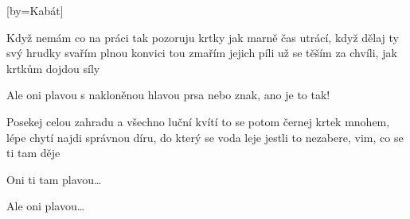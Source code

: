 [by={Kabát}]

\beginverse{}
Když nemám co na práci tak pozoruju krtky
jak marně čas utrácí, když dělaj ty svý hrudky
svařím plnou konvici tou zmařím jejich píli
už se těším za chvíli, jak krtkům dojdou síly
\endverse{}

\beginchorus{}
Ale oni plavou
s nakloněnou hlavou
prsa nebo znak,
ano je to tak!
\endchorus{}

\beginverse{}
Posekej celou zahradu a všechno luční kvítí
to se potom černej krtek mnohem, lépe chytí
najdi správnou díru, do který se voda leje
jestli to nezabere, vim, co se ti tam děje
\endverse{}

\beginchorus{}
Oni ti tam plavou\ldots{}
\endchorus{}

\beginchorus{}
Ale oni plavou\ldots{}
\endchorus{}

\endsong{}

